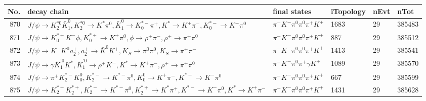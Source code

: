 \begin{table}[htbp] 
\begin{center}
\begin{small}
\begin{tabular}{rlllll}\hline\hline
 No. & decay chain & final states &  iTopology & nEvt & nTot \\\hline
870&$J/\psi       \rightarrow K_2^{*0}       \bar{K}_1^{0} , K_2^{*0}        \rightarrow K^{*}          \pi^{0}        , \bar{K}_1^{0}  \rightarrow K_{0}^{*-}     \pi^{+}        , K^{*}           \rightarrow K^{+}          \pi^{-}        , K_{0}^{*-}      \rightarrow K^{-}          \pi^{0}        $&$\pi^{-}        K^{-}          \pi^{0}        \pi^{0}        \pi^{+}        K^{+}          $& 1683&   29&385483\\
871&$J/\psi       \rightarrow K_{0}^{*+}     K^{-}          \phi           , K_{0}^{*+}      \rightarrow K^{+}          \pi^{0}        , \phi            \rightarrow \rho^{+}      \pi^{-}        , \rho^{+}       \rightarrow \pi^{+}        \pi^{0}        $&$\pi^{-}        K^{-}          \pi^{0}        \pi^{0}        \pi^{+}        K^{+}          $&  887&   29&385512\\
872&$J/\psi       \rightarrow K^{-}          K^{0}          a_{2}^{+}      , a_{2}^{+}       \rightarrow \bar{K}^{0}   K^{+}          , K_{S}           \rightarrow \pi^{0}        \pi^{0}        , K_{S}           \rightarrow \pi^{+}        \pi^{-}        $&$\pi^{-}        K^{-}          \pi^{0}        \pi^{0}        \pi^{+}        K^{+}          $& 1413&   29&385541\\
873&$J/\psi       \rightarrow \gamma       \bar{K}_1^{'0}K^{*}          , \bar{K}_1^{'0} \rightarrow \rho^{+}      K^{-}          , K^{*}           \rightarrow K^{+}          \pi^{-}        , \rho^{+}       \rightarrow \pi^{+}        \pi^{0}        $&$\pi^{-}        K^{-}          \pi^{0}        \pi^{+}        \gamma       K^{+}          $& 1089&   29&385570\\
874&$J/\psi       \rightarrow \pi^{+}        K_2^{*-}       K_0^{0}        , K_2^{*-}        \rightarrow K^{*-}         \pi^{0}        , K_0^{0}         \rightarrow K^{+}          \pi^{-}        , K^{*-}          \rightarrow K^{-}          \pi^{0}        $&$\pi^{-}        K^{-}          \pi^{0}        \pi^{0}        \pi^{+}        K^{+}          $&  667&   29&385599\\
875&$J/\psi       \rightarrow K_2^{*-}       K_2^{*+}       , K_2^{*-}        \rightarrow K^{*-}         \pi^{0}        , K_2^{*+}        \rightarrow K^{*}          \pi^{+}        , K^{*-}          \rightarrow K^{-}          \pi^{0}        , K^{*}           \rightarrow K^{+}          \pi^{-}        $&$\pi^{-}        K^{-}          \pi^{0}        \pi^{0}        \pi^{+}        K^{+}          $& 1431&   29&385628\\

\end{tabular}
\end{small}
\end{center}
\end{table}
